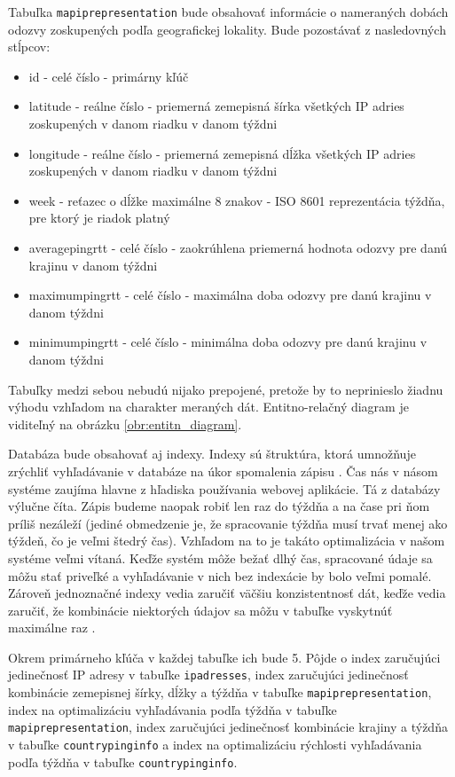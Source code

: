 Tabuľka \lstinline{mapiprepresentation} bude obsahovať informácie o nameraných dobách 
odozvy zoskupených podľa geografickej lokality. Bude pozostávať z nasledovných stĺpcov:
\begin{itemize}
    \item id - celé číslo - primárny kľúč
    \item latitude - reálne číslo - priemerná zemepisná šírka všetkých IP adries zoskupených v danom riadku v danom týždni
    \item longitude - reálne číslo - priemerná zemepisná dĺžka všetkých IP adries zoskupených v danom riadku v danom týždni
    \item week - reťazec o dĺžke maximálne 8 znakov - ISO 8601 reprezentácia týždňa, pre ktorý je riadok platný
    \item averagepingrtt - celé číslo - zaokrúhlena priemerná hodnota odozvy pre danú krajinu v danom týždni
    \item maximumpingrtt - celé číslo - maximálna doba odozvy pre danú krajinu v danom týždni
    \item minimumpingrtt - celé číslo - minimálna doba odozvy pre danú krajinu v danom týždni
\end{itemize}

Tabuľky medzi sebou nebudú nijako prepojené, pretože by to neprinieslo žiadnu výhodu vzhľadom na charakter 
meraných dát. Entitno-relačný diagram je viditeľný na obrázku \ref{obr:entitn_diagram}.

Databáza bude obsahovať aj indexy. Indexy sú štruktúra, ktorá umnožňuje zrýchliť vyhľadávanie v databáze na úkor spomalenia zápisu \cite{db_index}. 
Čas nás v násom systéme zaujíma hlavne z hľadiska používania webovej aplikácie. Tá z databázy výlučne číta. Zápis budeme naopak robiť len raz do týždňa 
a na čase pri ňom príliš nezáleží (jediné obmedzenie je, že spracovanie týždňa musí trvať menej ako týždeň, čo je veľmi štedrý čas). Vzhľadom na to je 
takáto optimalizácia v našom systéme veľmi vítaná. Keďže systém môže bežať dlhý čas, spracované údaje sa môžu stať priveľké a vyhľadávanie v nich bez 
indexácie by bolo veľmi pomalé. Zároveň jednoznačné indexy vedia zaručiť väčšiu konzistentnosť dát, keďže vedia zaručiť, že kombinácie niektorých údajov 
sa môžu v tabuľke vyskytnúť maximálne raz \cite{index_strategy}.

Okrem primárneho kľúča v každej tabuľke ich bude 5. Pôjde o index zaručujúci jedinečnosť IP adresy v tabuľke 
\lstinline{ipadresses}, index zaručujúci jedinečnosť kombinácie zemepisnej šírky, dĺžky a týždňa v tabuľke \lstinline{mapiprepresentation}, index na 
optimalizáciu vyhľadávania podľa týždňa v tabuľke \lstinline{mapiprepresentation}, index zaručujúci jedinečnosť kombinácie krajiny a týždňa v tabuľke 
\lstinline{countrypinginfo} a index na optimalizáciu rýchlosti vyhľadávania podľa týždňa v tabuľke \lstinline{countrypinginfo}.

